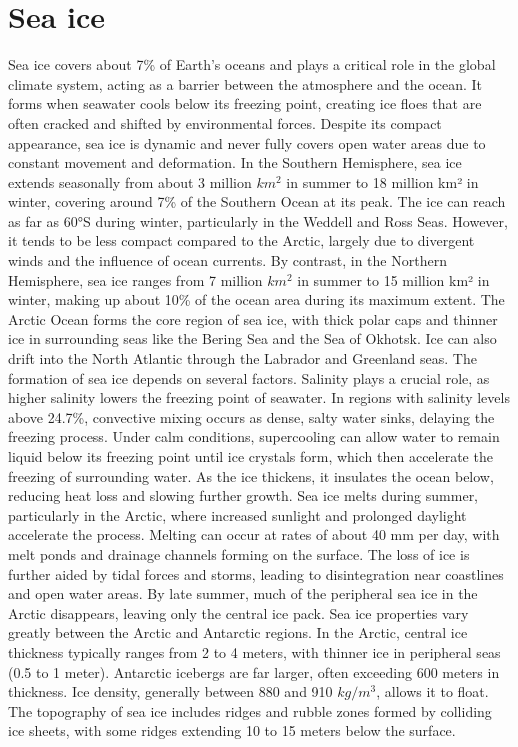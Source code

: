 \section{Sea ice}\label{sec:sea-ice}
Sea ice covers about 7\% of Earth's oceans and plays a critical role in the global climate system, acting as a barrier between the atmosphere and the ocean. It forms when seawater cools below its freezing point, creating ice floes that are often cracked and shifted by environmental forces. Despite its compact appearance, sea ice is dynamic and never fully covers open water areas due to constant movement and deformation.
In the Southern Hemisphere, sea ice extends seasonally from about 3 million \(km^2\) in summer to 18 million km² in winter, covering around 7\% of the Southern Ocean at its peak. The ice can reach as far as 60°S during winter, particularly in the Weddell and Ross Seas. However, it tends to be less compact compared to the Arctic, largely due to divergent winds and the influence of ocean currents. By contrast, in the Northern Hemisphere, sea ice ranges from 7 million \(km^2\) in summer to 15 million km² in winter, making up about 10\% of the ocean area during its maximum extent. The Arctic Ocean forms the core region of sea ice, with thick polar caps and thinner ice in surrounding seas like the Bering Sea and the Sea of Okhotsk. Ice can also drift into the North Atlantic through the Labrador and Greenland seas.
The formation of sea ice depends on several factors. Salinity plays a crucial role, as higher salinity lowers the freezing point of seawater. In regions with salinity levels above 24.7\%, convective mixing occurs as dense, salty water sinks, delaying the freezing process. Under calm conditions, supercooling can allow water to remain liquid below its freezing point until ice crystals form, which then accelerate the freezing of surrounding water. As the ice thickens, it insulates the ocean below, reducing heat loss and slowing further growth.
Sea ice melts during summer, particularly in the Arctic, where increased sunlight and prolonged daylight accelerate the process. Melting can occur at rates of about 40 mm per day, with melt ponds and drainage channels forming on the surface. The loss of ice is further aided by tidal forces and storms, leading to disintegration near coastlines and open water areas. By late summer, much of the peripheral sea ice in the Arctic disappears, leaving only the central ice pack.
Sea ice properties vary greatly between the Arctic and Antarctic regions. In the Arctic, central ice thickness typically ranges from 2 to 4 meters, with thinner ice in peripheral seas (0.5 to 1 meter). Antarctic icebergs are far larger, often exceeding 600 meters in thickness. Ice density, generally between 880 and 910 \(kg/m^3\), allows it to float. The topography of sea ice includes ridges and rubble zones formed by colliding ice sheets, with some ridges extending 10 to 15 meters below the surface.
